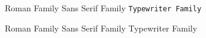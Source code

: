 \documentclass{article}%
\begin{document}
\textrm{Roman Family}
\textsf{Sans Serif Family}
\texttt{Typewriter Family}

{\rmfamily Roman Family}
{\sffamily Sans Serif Family}
{\ttfamily Typewriter Family}
\end{document}

